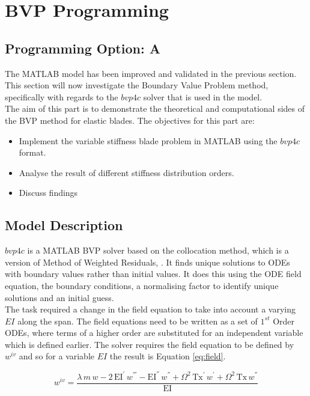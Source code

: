 \documentclass[11pt]{article}
\begin{document}
\section{BVP Programming}
\subsection{Programming Option: A}
The MATLAB model has been improved and validated in the previous section. This section will now investigate the Boundary Value Problem method, specifically with regards to the $bvp4c$ solver that is used in the model.\\
The aim of this part is to demonstrate the theoretical and computational sides of the BVP method for elastic blades. The objectives for this part are:

\begin{itemize}
    \item Implement the variable stiffness blade problem in MATLAB using the $bvp4c$ format.
    \item Analyse the result of different stiffness distribution orders.
    \item Discuss findings
\end{itemize}

\subsection{Model Description}
$bvp4c$ is a MATLAB BVP solver based on the collocation method, which is a version of Method of Weighted Residuals, \cite{bvp}. It finds unique solutions to ODEs with boundary values rather than initial values. It does this using the ODE field equation, the boundary conditions, a normalising factor to identify unique solutions and an initial guess.\\
The task required a change in the field equation to take into account a varying $EI$ along the span. 
The field equations need to be written as a set of $1^{st}$ Order ODEs, where terms of a higher order are substituted for an independent variable which is defined earlier.
The solver requires the field equation to be defined by $w^{iv}$ and so for a variable $EI$ the result is Equation \ref{eq:field}.

\begin{equation}
    w^{iv}=\frac{\lambda \,m\,w-2\,\mathrm{EI^{'}}\,w^{'''}-\mathrm{EI^{''}}\,w^{''}+\Omega ^2\,\mathrm{Tx^{'}}\,w^{'}+\Omega ^2\,\mathrm{Tx}\,w^{''}}{\mathrm{EI}} \label{eq:field}
\end{equation}{}
\end{document}
